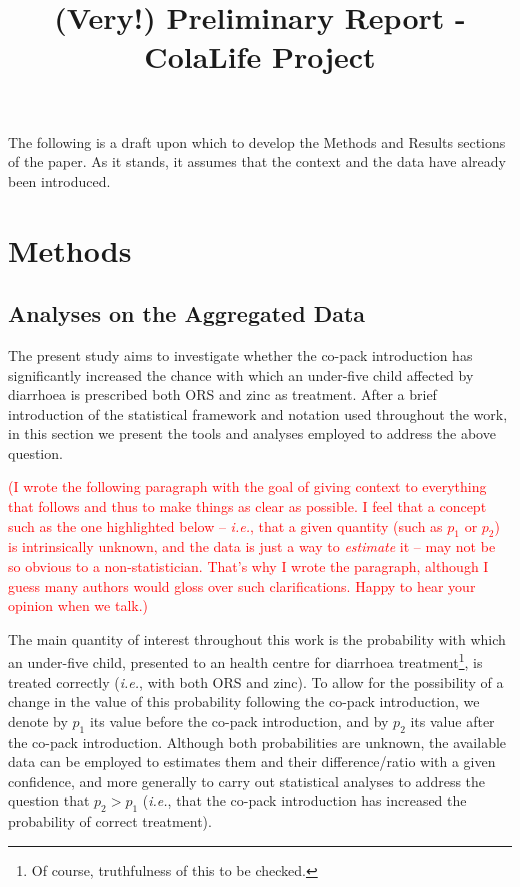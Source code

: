 \documentclass[a4paper, 12pt]{article}
\title{(Very!) Preliminary Report - ColaLife Project}
\author{}
\date{}
\newcommand{\red}{\textcolor{red}}
\begin{document}
\maketitle

The following is a draft upon which to develop the Methods and Results sections of the paper. As it stands, it assumes that the context and the data have already been introduced.

\section{Methods}

\subsection{Analyses on the Aggregated Data}
The present study aims to investigate whether the co-pack introduction has significantly increased the chance with which an under-five child affected by diarrhoea is prescribed both ORS and zinc as treatment. After a brief introduction of the statistical framework and notation used throughout the work, in this section we present the tools and analyses employed to address the above question.  

{\footnotesize \red{(I wrote the following paragraph with the goal of giving context to everything that follows and thus to make things as clear as possible. I feel that a concept such as the one highlighted below -- \textit{i.e.}, that a given quantity (such as $p_1$ or $p_2$) is intrinsically unknown, and the data is just a way to \emph{estimate} it -- may not be so obvious to a non-statistician. That's why I wrote the paragraph, although I guess many authors would gloss over such clarifications. Happy to hear your opinion when we talk.)}}


The main quantity of interest throughout this work is the probability with which an under-five child, presented to an health centre for diarrhoea treatment\footnote{Of course, truthfulness of this to be checked.}, is treated correctly (\textit{i.e.}, with both ORS and zinc).
To allow for the possibility of a change in the value of this probability following the co-pack introduction, 
 we denote by $p_1$ its value before the co-pack introduction, and by $p_2$ its value after the co-pack introduction. 
Although both probabilities are unknown, the available data can be employed to estimates them and their difference/ratio with a given confidence, and more generally to carry out statistical analyses to address the question that $p_2>p_1$ (\textit{i.e.}, that the co-pack introduction has increased the probability of correct treatment).
\end{document}
